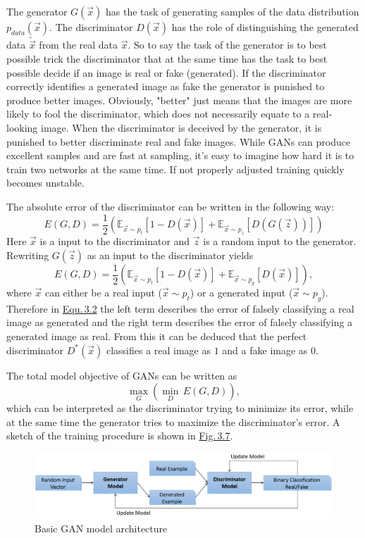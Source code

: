 The generator $G(\vec{x})$ has the task of generating samples of the data distribution $p_{data}(\vec{x})$. The discriminator $D(\vec{x})$ has the role of distinguishing the generated data $\tilde{\vec{x}}$ from the real data $\vec{x}$. So to say the task of the generator is to best possible trick the discriminator that at the same time has the task to best possible decide if an image is real or fake (generated). If the discriminator correctly identifies a generated image as fake the generator is punished to produce better images. Obviously, "better" just means that the images are more likely to fool the discriminator, which does not necessarily equate to a real-looking image. When the discriminator is deceived by the generator, it is punished to better discriminate real and fake images. While GANs can produce excellent samples and are fast at sampling, it's easy to imagine how hard it is to train two networks at the same time. If not properly adjusted training quickly becomes unstable.

The absolute error of the discriminator can be written in the following way:
%
\begin{equation}
    E(G,D)=\frac{1}{2}\left(\mathbb{E}_{\vec{x}\sim p_{t}}[1-D(\vec{x})]+\mathbb{E}_{\vec{x}\sim p_{z}}[D(G(\vec{z}))]\right)
\end{equation}
%
Here $\vec{x}$ is a input to the discriminator and $\vec{z}$ is a random input to the generator. Rewriting $G(\vec{z})$ as an input to the discriminator yields
%
\begin{equation} \label{equ:3.2}
    E(G,D)=\frac{1}{2}\left(\mathbb{E}_{\vec{x}\sim p_{t}}[1-D(\vec{x})]+\mathbb{E}_{\vec{x}\sim p_{g}}[D(\vec{x})]\right),
\end{equation}
%
where $\vec{x}$ can either be a real input ($\vec{x}\sim p_t$) or a generated input ($\vec{x}\sim p_g$). Therefore in \hyperref[equ:3.2]{Equ.\,3.2} the left term describes the error of falsely classifying a real image as generated and the right term describes the error of falsely classifying a generated image as real. From this it can be deduced that the perfect discriminator $D^*(\vec{x})$ classifies a real image as $1$ and a fake image as $0$. 

The total model objective of GANs can be written as 
%
\begin{equation} \label{equ:3.3}
    \underset{G}{\max}\left(\underset{D}{\min}\,E(G,D)\right),
\end{equation}
%
which can be interpreted as the discriminator trying to minimize its error, while at the same time the generator tries to maximize the discriminator's error. A sketch of the training procedure is shown in \hyperref[fig:3.7]{Fig.\,3.7}. 
%
\begin{figure} \label{fig:3.7}
    \centering
    \includegraphics[width=.9\textwidth]{Chapters/figures/gan.PNG}
    \caption{Basic GAN model architecture}
\end{figure}
%

